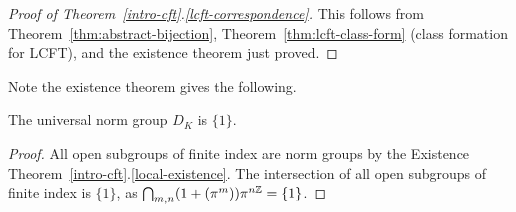 \begin{proof}[Proof of Theorem~\ref{intro-cft}.\ref{lcft-correspondence}]
This follows from Theorem~\ref{thm:abstract-bijection}, Theorem~\ref{thm:lcft-class-form} (class formation for LCFT), and the existence theorem just proved.
\end{proof}
Note the existence theorem gives the following.
\begin{cor}
The universal norm group $D_K$ is $\{1\}$.
\end{cor}
\begin{proof}
All open subgroups of finite index are norm groups by the Existence Theorem~\ref{intro-cft}.\ref{local-existence}. The intersection of all open subgroups of finite index is $\{1\}$, as $\bigcap_{m,n} (1+(\pi^m))\pi^{n\mathbb{Z}}=\{1\}$.
\end{proof}
